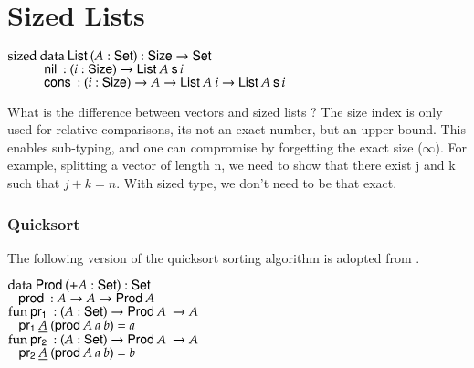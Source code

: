 \section{Sized Lists}
\begin{bsp}
$\mathrm{sized}\: \mathrm{data}\: \mathsf{List}\: ( A : \mathsf{Set} ) : \mathsf{Size} \rightarrow \mathsf{Set} $ \\
$\spcx \nil : \EPi{i}{\Size}{ \List A \: \s i} $\\
$\spcx \cons : \EPi{i}{\Size}{ A \ra \List A \: i \ra \List A \: \s i} $
\end{bsp}

What is the difference between vectors and sized lists ?
The size index is only used for relative comparisons, its not an exact number, but an upper bound.
This enables sub-typing, and one can compromise by forgetting the exact size ($\infty$).
For example, splitting a vector of length n, we need to show that there exist j and k such that $j+k = n$.
With sized type, we don't need to be that exact.

\subsubsection{Quicksort}
The following version of the quicksort sorting algorithm is adopted from \cite{abel:rairo04}.
\begin{bsp}
$\mathrm{data}\: \mathsf{Prod}\: ( + A : \mathsf{Set}) : \mathsf{Set}$\\
$\hspace*{3mm}  \mathsf{prod}\: : A \rightarrow A \rightarrow \mathsf{Prod}\: A$\\

$\mathrm{fun}\: \mathsf{pr_1}\: : ( A : \mathsf{Set} ) \rightarrow \mathsf{Prod}\: A\: \rightarrow A$\\
$\hspace*{3mm} \mathsf{pr_1}\: \underline{A}\: (\mathsf{prod}\: A\: a \: b) = a$\\

$\mathrm{fun}\: \mathsf{pr_2}\: : ( A : \mathsf{Set} ) \rightarrow \mathsf{Prod}\: A\: \rightarrow A$\\
$\hspace*{3mm} \mathsf{pr_2}\: \underline{A}\: (\mathsf{prod}\: A\: a \: b) = b$\\
\end{bsp}

